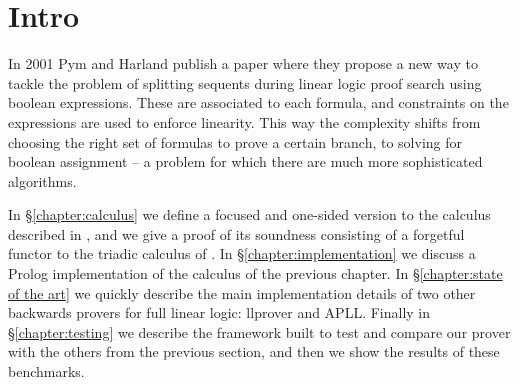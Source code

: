 \chapter{Intro}\label{chapter:intro}
In 2001 Pym and Harland publish a paper \cite{HarlandPym} where they propose a new way to tackle the problem of splitting sequents during linear logic proof search using boolean expressions.
These are associated to each formula, and constraints on the expressions are used to enforce linearity.
This way the complexity shifts from choosing the right set of formulas to prove a certain branch, to solving for boolean assignment -- a problem for which there are much more sophisticated algorithms.

In \S\ref{chapter:calculus} we define a focused and one-sided version to the calculus described in \cite{HarlandPym}, and we give a proof of its soundness consisting of a forgetful functor to the triadic calculus of \cite{Focusing}.
In \S\ref{chapter:implementation} we discuss a Prolog implementation of the calculus of the previous chapter.
In \S\ref{chapter:state of the art} we quickly describe the main implementation details of two other backwards provers for full linear logic: llprover and APLL.
Finally in \S\ref{chapter:testing} we describe the framework built to test and compare our prover with the others from the previous section, and then we show the results of these benchmarks.


